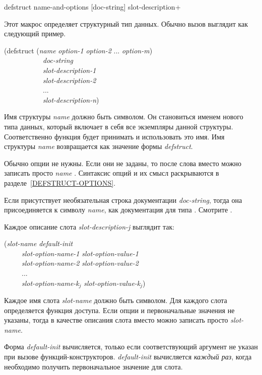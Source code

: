 \begin{defmac}
defstruct name-and-options [doc-string] {slot-description}+

Этот макрос определяет структурный тип данных.
Обычно вызов  выглядит как следующий пример.
\begin{lisp}
(defstruct (\emph{name} \emph{option-1} \emph{option-2} ... \emph{option-m}) \\
~~~~~~~~~~~\emph{doc-string} \\
~~~~~~~~~~~\emph{slot-description-1} \\
~~~~~~~~~~~\emph{slot-description-2} \\
~~~~~~~~~~~... \\
~~~~~~~~~~~\emph{slot-description-n}) \\
\end{lisp}
Имя структуры \emph{name} должно быть символом. Он становиться именем нового типа данных,
который включает в себя все экземпляры данной структуры.
Соответственно функция  будет принимать и использовать это
имя. Имя структуры \emph{name} возвращается как значение формы \emph{defstruct}.

Обычно опции не нужны. Если они не заданы, то после слова  вместо
 можно записать просто \emph{name} . Синтаксис опций и их
смысл раскрываются в разделе~\ref{DEFSTRUCT-OPTIONS}.

Если присутствует необязательная строка документации \emph{doc-string}, тогда
она присоединяется к символу \emph{name}, как документация для типа
. Смотрите .

Каждое описание слота \emph{slot-description-j} выглядит так:
\begin{lisp}
(\emph{slot-name} \emph{default-init} \\
~~~~~\emph{slot-option-name-1} \emph{slot-option-value-1} \\
~~~~~\emph{slot-option-name-2} \emph{slot-option-value-2} \\
~~~~~... \\
~~~~~\emph{slot-option-name-k${}_{j}$} \emph{slot-option-value-k${}_{j}$})
\end{lisp}
Каждое имя слота \emph{slot-name} должно быть символом. Для каждого слота
определяется функция доступа. Если опции и первоначальные значения не указаны,
тогда в качестве описания слота вместо  можно записать просто
\emph{slot-name}.

Форма \emph{default-init} вычисляется, только если соответствующий аргумент не
указан при вызове функций-конструкторов.
\emph{default-init} вычисляется \emph{каждый раз}, когда необходимо получить
первоначальное значение для слота.


\end{defmac}
